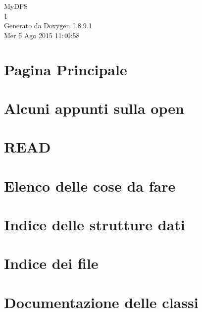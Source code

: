 \documentclass[twoside]{book}
\newcommand{\+}{\discretionary{\mbox{\scriptsize$\hookleftarrow$}}{}{}}
\newcommand{\clearemptydoublepage}{%
  \newpage{\pagestyle{empty}\cleardoublepage}%
}
\begin{document}
\hypersetup{pageanchor=false,
             bookmarks=true,
             bookmarksnumbered=true,
             pdfencoding=unicode
            }
\begin{titlepage}
\vspace*{7cm}
\begin{center}%
{\Large My\+D\+F\+S \\[1ex]\large 1 }\\
\vspace*{1cm}
{\large Generato da Doxygen 1.8.9.1}\\
\vspace*{0.5cm}
{\small Mer 5 Ago 2015 11:40:58}\\
\end{center}
\end{titlepage}
\clearemptydoublepage
\tableofcontents
\clearemptydoublepage
{}
\hypersetup{pageanchor=true}

\chapter{Pagina Principale}
\label{index}\hypertarget{index}{}
\chapter{Alcuni appunti sulla open}
\label{md_OPE}
\hypertarget{md_OPE}{}

\chapter{R\+E\+A\+D}
\label{md_READ}
\hypertarget{md_READ}{}

\chapter{Elenco delle cose da fare}
\label{todo}
\hypertarget{todo}{}

\chapter{Indice delle strutture dati}

\chapter{Indice dei file}

\chapter{Documentazione delle classi}







\end{document}
